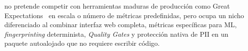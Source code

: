 \dataqual no pretende competir con herramientas maduras de producción como
Great Expectations~\citep{greatexpectations} en escala o número de métricas
predefinidas, pero ocupa un nicho diferenciado al combinar interfaz web
completa, métricas específicas para \ac{ML}, \emph{fingerprinting} determinista,
\emph{Quality Gates} y protección nativa de \ac{PII} en un paquete autoalojado
que no requiere escribir código.


